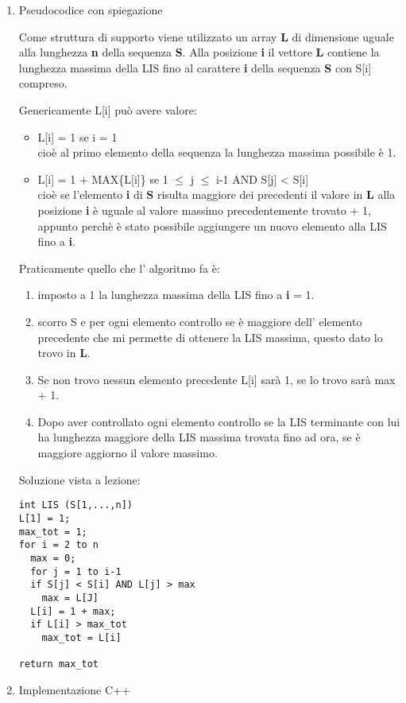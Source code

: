 \documentclass[11pt]{article}
\begin{document}
\begin{enumerate}
\begin{enumerate}
\item Pseudocodice con spiegazione
\label{sec:org4a01437}

Come struttura di supporto viene utilizzato un array \textbf{L} di dimensione uguale alla
lunghezza \textbf{n} della sequenza \textbf{S}.
Alla posizione \textbf{i} il vettore \textbf{L} contiene la lunghezza massima della LIS fino al
carattere \textbf{i} della sequenza \textbf{S} con S[i] compreso.

Genericamente L[i] può avere valore:
\begin{itemize}
\item L[i] = 1 se i = 1\\
cioè al primo elemento della sequenza la lunghezza massima possibile è 1.
\item L[i] = 1 + MAX\{L[i]\} se 1 \(\le\) j \(\le\) i-1 AND S[j] < S[i] \\
cioè se l'elemento \textbf{i} di \textbf{S} risulta maggiore dei precedenti il valore in \textbf{L} alla posizione \textbf{i}
è uguale al valore massimo precedentemente trovato + 1, appunto perchè è stato possibile aggiungere
un nuovo elemento alla LIS fino a \textbf{i}.
\end{itemize}

Praticamente quello che l' algoritmo fa è:
\begin{enumerate}
\item imposto a 1 la lunghezza massima della LIS fino a \textbf{i} = 1.
\item scorro S e per ogni elemento controllo se è maggiore dell' elemento precedente che mi permette
di ottenere la LIS massima, questo dato lo trovo in \textbf{L}.
\item Se non trovo nessun elemento precedente L[i] sarà 1, se lo trovo sarà max + 1.
\item Dopo aver controllato ogni elemento controllo se la LIS terminante con lui ha lunghezza maggiore della
LIS massima trovata fino ad ora, se è maggiore aggiorno il valore massimo.
\end{enumerate}

Soluzione vista a lezione:
\begin{verbatim}
int LIS (S[1,...,n])
L[1] = 1;
max_tot = 1;
for i = 2 to n
  max = 0;
  for j = 1 to i-1
  if S[j] < S[i] AND L[j] > max
    max = L[J]
  L[i] = 1 + max;
  if L[i] > max_tot
    max_tot = L[i]

return max_tot
\end{verbatim}


\item Implementazione C++
\label{sec:org1e1b95f}


\end{enumerate}
\end{enumerate}
\end{document}
